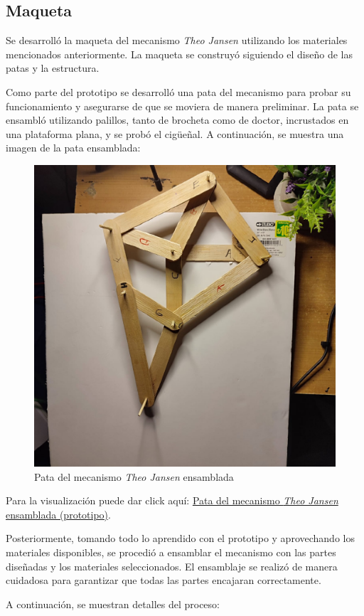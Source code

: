 \newpage
\subsection{Maqueta}

Se desarrolló la maqueta del mecanismo \textit{Theo Jansen} utilizando los materiales mencionados anteriormente. La maqueta se construyó siguiendo el diseño de las patas y la estructura.

Como parte del prototipo se desarrolló una pata del mecanismo para probar su funcionamiento y asegurarse de que se moviera de manera preliminar. La pata se ensambló utilizando palillos, tanto de brocheta como de doctor, incrustados en una plataforma plana, y se probó el cigüeñal. A continuación, se muestra una imagen de la pata ensamblada:

\begin{figure}[H]
  \centering
  \includegraphics[width=0.35\linewidth]{./assets/palillos.jpeg}
  \caption{Pata del mecanismo \textit{Theo Jansen} ensamblada}
  \label{fig:pata_ensamblada}
\end{figure}

Para la visualización puede dar click aquí: \href{https://youtu.be/T9oyePn2VmM}{Pata del mecanismo \textit{Theo Jansen} ensamblada (prototipo)}.

Posteriormente, tomando todo lo aprendido con el prototipo y aprovechando los materiales disponibles, se procedió a ensamblar el mecanismo con las partes diseñadas y los materiales seleccionados. El ensamblaje se realizó de manera cuidadosa para garantizar que todas las partes encajaran correctamente.

A continuación, se muestran detalles del proceso:

